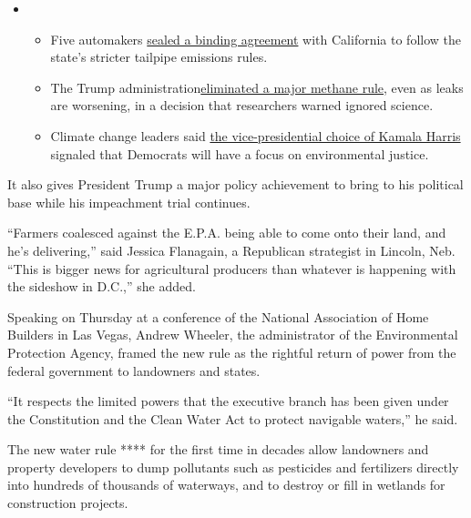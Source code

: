 \begin{itemize}
\item
  \begin{itemize}
  \tightlist
  \item
    Five automakers
    \href{https://www.nytimes3xbfgragh.onion/2020/08/17/climate/california-automakers-pollution.html?action=click\&pgtype=Article\&state=default\&region=MAIN_CONTENT_1\&context=storylines_keepup}{sealed
    a binding agreement} with California to follow the state's stricter
    tailpipe emissions rules.
  \item
    The Trump
    administration\href{https://www.nytimes3xbfgragh.onion/2020/08/13/climate/trump-methane.html?action=click\&pgtype=Article\&state=default\&region=MAIN_CONTENT_1\&context=storylines_keepup}{eliminated
    a major methane rule}, even as leaks are worsening, in a decision
    that researchers warned ignored science.
  \item
    Climate change leaders said
    \href{https://www.nytimes3xbfgragh.onion/2020/08/12/climate/kamala-harris-environmental-justice.html?action=click\&pgtype=Article\&state=default\&region=MAIN_CONTENT_1\&context=storylines_keepup}{the
    vice-presidential choice of Kamala Harris} signaled that Democrats
    will have a focus on environmental justice.
  \end{itemize}
\end{itemize}

It also gives President Trump a major policy achievement to bring to his
political base while his impeachment trial continues.

``Farmers coalesced against the E.P.A. being able to come onto their
land, and he's delivering,'' said Jessica Flanagain, a Republican
strategist in Lincoln, Neb. ``This is bigger news for agricultural
producers than whatever is happening with the sideshow in D.C.,'' she
added.

Speaking on Thursday at a conference of the National Association of Home
Builders in Las Vegas, Andrew Wheeler, the administrator of the
Environmental Protection Agency, framed the new rule as the rightful
return of power from the federal government to landowners and states.

``It respects the limited powers that the executive branch has been
given under the Constitution and the Clean Water Act to protect
navigable waters,'' he said.

The new water rule **** for the first time in decades allow landowners
and property developers to dump pollutants such as pesticides and
fertilizers directly into hundreds of thousands of waterways, and to
destroy or fill in wetlands for construction projects.

